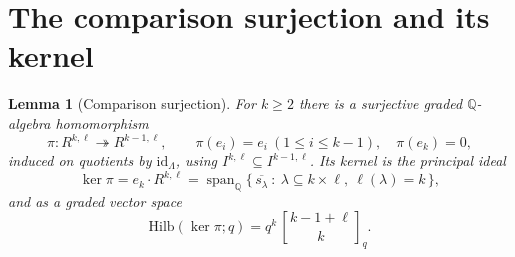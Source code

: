 \documentclass{amsart}
\newtheorem{lemma}{Lemma}
\theoremstyle{definition}
\newcommand{\Hilb}{\mathrm{Hilb}}
\newcommand{\qbin}[2]{\genfrac{[}{]}{0pt}{}{#1}{#2}_q}
\newcommand{\Q}{\mathbb{Q}}
\newcommand{\rkl}{R^{k,\ell}}
\begin{document}
\section{The comparison surjection and its kernel}

\begin{lemma}[Comparison surjection]\label{lem:pi}
For $k\ge2$ there is a surjective graded $\Q$-algebra homomorphism
\[
\pi\colon \rkl\twoheadrightarrow R^{k-1,\ell},\qquad \pi(e_i)=e_i\ (1\le i\le k-1),
\quad \pi(e_k)=0,
\]
induced on quotients by $\mathrm{id}_\Lambda$, using $I^{k,\ell}\subseteq I^{k-1,\ell}$.
Its kernel is the principal ideal
\begin{equation}\label{eq:kerpi}
\ker\pi=e_k\cdot\rkl
=\operatorname{span}_{\Q}\{\,\overline{s_\lambda}\ :\ \lambda\subseteq k\times\ell,\ \ell(\lambda)=k\,\},
\end{equation}
and as a graded vector space
\begin{equation}\label{eq:kerHilb}
\Hilb(\ker\pi;q)=q^{k}\,\qbin{k-1+\ell}{k}.
\end{equation}
\end{lemma}
\end{document}
